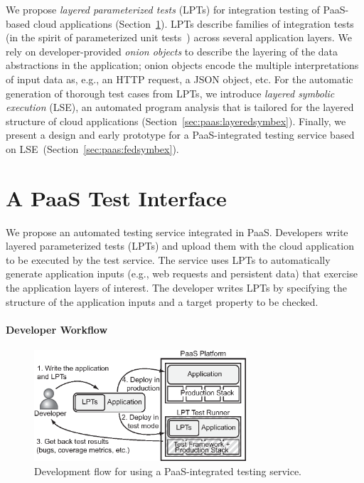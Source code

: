 We propose \textit{layered parameterized tests} (LPTs) for integration testing of PaaS-based cloud applications (Section~\ref{sec:paas:abstractions}). LPTs describe families of integration tests (in the spirit of parameterized unit tests~\cite{tillmann-puts}) across several application layers. We rely on developer-provided \textit{onion objects} to describe the layering of the data abstractions in the application; onion objects encode the multiple interpretations of input data as, e.g., an HTTP request, a JSON object, etc.
%
For the automatic generation of thorough test cases from LPTs, we introduce \emph{layered symbolic execution} (LSE), an automated program analysis that is tailored for the layered structure of cloud applications (Section~\ref{sec:paas:layeredsymbex}).
%
Finally, we present a design and early prototype for a PaaS-integrated testing service based on LSE~(Section~\ref{sec:paas:fedsymbex}).

\section{A PaaS Test Interface}
\label{sec:paas:abstractions}

We propose an automated testing service integrated in PaaS.  Developers write layered parameterized tests (LPTs) and upload them with the cloud application to be executed by the test service.  The service uses LPTs to automatically generate application inputs (e.g., web requests and persistent data) that exercise the application layers of interest.  The developer writes LPTs by specifying the structure of the application inputs and a target property to be checked.

\paragraph{Developer Workflow}

\begin{figure}
  \centering
  \includegraphics[width=3.1in]{figures/paas/developer-flow}
  \caption{Development flow for using a PaaS-integrated testing
    service.}
  \label{fig:development-flow}
\end{figure}

